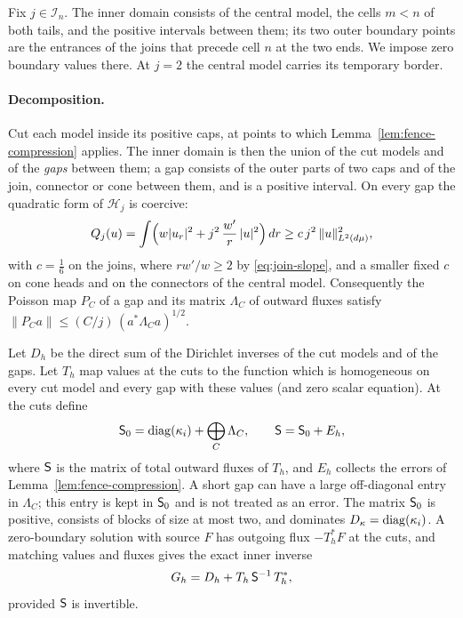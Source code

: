 Fix $j\in\mathcal I_n$. The inner domain consists of the central
model, the cells $m<n$ of both tails, and the positive intervals
between them; its two outer boundary points are the entrances of the
joins that precede cell $n$ at the two ends. We impose zero boundary
values there. At $j=2$ the central model carries its temporary border.

\paragraph{Decomposition.}
Cut each model inside its positive caps, at points to which
Lemma~\ref{lem:fence-compression} applies. The inner domain is then
the union of the cut models and of the \emph{gaps} between them; a gap
consists of the outer parts of two caps and of the join, connector or
cone between them, and is a positive interval. On every gap the
quadratic form of $\mathscr H_j$ is coercive:
\begin{equation}\label{eq:rad-eq-hn5}
 Q_j(u)=\int\Bigl(w|u_r|^2+j^2\,\frac{w'}r\,|u|^2\Bigr)\,dr
               \ge c\,j^2\,\|u\|_{L^2(d\mu)}^2 ,
\end{equation}
with $c=\tfrac16$ on the joins, where $rw'/w\ge2$ by
\eqref{eq:join-slope}, and a smaller fixed $c$ on cone heads and on
the connectors of the central model. Consequently the Poisson map
$P_C$ of a gap and its matrix $\Lambda_C$ of outward fluxes satisfy
$\|P_Ca\|\le(C/j)\,(a^*\Lambda_Ca)^{1/2}$.

Let $D_h$ be the direct sum of the Dirichlet inverses of the cut
models and of the gaps. Let $T_h$ map values at the cuts to the
function which is homogeneous on every cut model and every gap with
these values (and zero scalar equation). At the cuts define
\begin{equation}\label{eq:rad-eq-hn6}
 \mathsf S_0=\operatorname{diag}(\kappa_i)+\bigoplus_C\Lambda_C,
 \qquad \mathsf S=\mathsf S_0+E_h ,
\end{equation}
where $\mathsf S$ is the matrix of total outward fluxes of $T_h$, and $E_h$
collects the errors of Lemma~\ref{lem:fence-compression}. A short gap
can have a large off-diagonal entry in $\Lambda_C$; this entry is kept
in $\mathsf S_0$ and is not treated as an error. The matrix $\mathsf S_0$ is
positive, consists of blocks of size at most two, and dominates
$D_\kappa=\operatorname{diag}(\kappa_i)$. A zero-boundary solution with source $F$
has outgoing flux $-T_h^*F$ at the cuts, and matching values and
fluxes gives the exact inner inverse
\begin{equation}\label{eq:rad-eq-hn9}
 G_h=D_h+T_h\,\mathsf S^{-1}\,T_h^* ,
\end{equation}
provided $\mathsf S$ is invertible.

